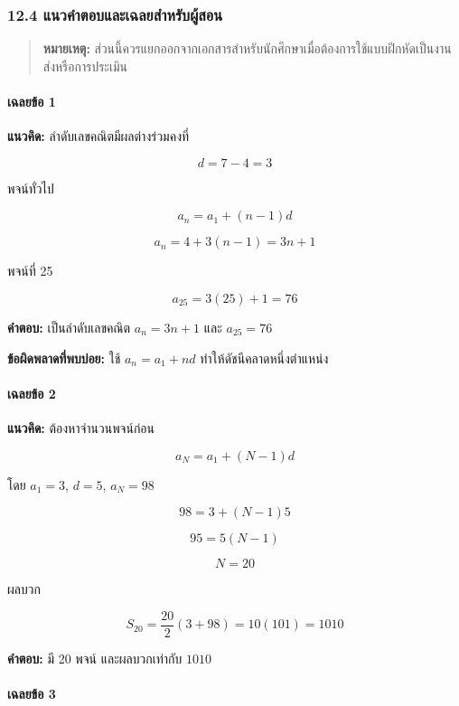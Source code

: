 \newpage

\subsubsection{12.4 แนวคำตอบและเฉลยสำหรับผู้สอน}

\begin{quote}
\textbf{หมายเหตุ:} ส่วนนี้ควรแยกออกจากเอกสารสำหรับนักศึกษาเมื่อต้องการใช้แบบฝึกหัดเป็นงานส่งหรือการประเมิน
\end{quote}

\paragraph{เฉลยข้อ 1}

\textbf{แนวคิด:} ลำดับเลขคณิตมีผลต่างร่วมคงที่

\[
d=7-4=3
\]

พจน์ทั่วไป

\[
a_n=a_1+(n-1)d
\]

\[
a_n=4+3(n-1)=3n+1
\]

พจน์ที่ 25

\[
a_{25}=3(25)+1=76
\]

\textbf{คำตอบ:} เป็นลำดับเลขคณิต \(a_n=3n+1\) และ \(a_{25}=76\)

\textbf{ข้อผิดพลาดที่พบบ่อย:} ใช้ \(a_n=a_1+nd\) ทำให้ดัชนีคลาดหนึ่งตำแหน่ง

\paragraph{เฉลยข้อ 2}

\textbf{แนวคิด:} ต้องหาจำนวนพจน์ก่อน

\[
a_N=a_1+(N-1)d
\]

โดย \(a_1=3\), \(d=5\), \(a_N=98\)

\[
98=3+(N-1)5
\]

\[
95=5(N-1)
\]

\[
N=20
\]

ผลบวก

\[
S_{20}=\frac{20}{2}(3+98)=10(101)=1010
\]

\textbf{คำตอบ:} มี 20 พจน์ และผลบวกเท่ากับ \(1010\)

\paragraph{เฉลยข้อ 3}

